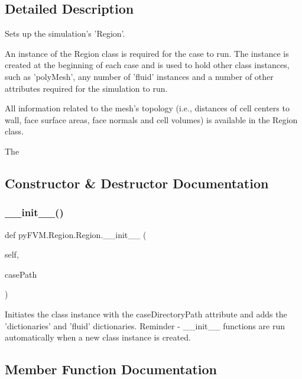 \subsection{Detailed Description}
\begin{DoxyVerb}Sets up the simulation's 'Region'.

An instance of the Region class is required for the case to run. 
The instance is created at the beginning of each case and is used to hold
other class instances, such as 'polyMesh', any number of 'fluid' instances
and a number of other attributes required for the simulation to run.

All information related to the mesh's topology (i.e., distances of cell centers to wall, face surface areas, face normals and cell volumes) is available in the Region class. 

The \end{DoxyVerb}
 

\subsection{Constructor \& Destructor Documentation}
\mbox{\label{classpy_f_v_m_1_1_region_1_1_region_ac630b03db4f4502a63f6581f9430d733}} 
\subsubsection{\texorpdfstring{\_\_init\_\_()}{\_\_init\_\_()}}
{\footnotesize\ttfamily def py\+F\+V\+M.\+Region.\+Region.\+\_\+\+\_\+init\+\_\+\+\_\+ (\begin{DoxyParamCaption}\item[{}]{self,  }\item[{}]{case\+Path }\end{DoxyParamCaption})}

\begin{DoxyVerb}Initiates the class instance with the caseDirectoryPath attribute 
and adds the 'dictionaries' and 'fluid' dictionaries. Reminder - 
__init__ functions are run automatically when a new class instance is 
created. 
\end{DoxyVerb}
 

\subsection{Member Function Documentation}
\mbox{\label{classpy_f_v_m_1_1_region_1_1_region_aa7a1cde8b5d0dcf3fe22ce5186512c87}} 
